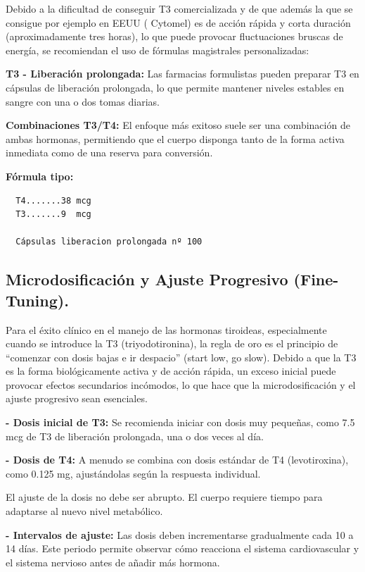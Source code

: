 \documentclass[
  spanish,
]{article}
\begin{document}
Debido a la dificultad de conseguir T3 comercializada y de que además la que se consigue por ejemplo en EEUU ( Cytomel) es de acción rápida y corta duración (aproximadamente tres horas), lo que puede provocar fluctuaciones bruscas de energía, se recomiendan el uso de fórmulas magistrales personalizadas:

\textbf{T3 - Liberación prolongada:} Las farmacias formulistas pueden preparar T3 en cápsulas de liberación prolongada, lo que permite mantener niveles estables en sangre con una o dos tomas diarias.

\textbf{Combinaciones T3/T4:} El enfoque más exitoso suele ser una combinación de ambas hormonas, permitiendo que el cuerpo disponga tanto de la forma activa inmediata como de una reserva para conversión.

\textbf{Fórmula tipo:}

\begin{verbatim}
  T4.......38 mcg
  T3.......9  mcg

  Cápsulas liberacion prolongada nº 100
\end{verbatim}

\subsection{Microdosificación y Ajuste Progresivo (Fine-Tuning).}\label{microdosificaciuxf3n-y-ajuste-progresivo-fine-tuning.}

Para el éxito clínico en el manejo de las hormonas tiroideas, especialmente cuando se introduce la T3 (triyodotironina), la regla de oro es el principio de ``comenzar con dosis bajas e ir despacio'' (start low, go slow).
Debido a que la T3 es la forma biológicamente activa y de acción rápida, un exceso inicial puede provocar efectos secundarios incómodos, lo que hace que la microdosificación y el ajuste progresivo sean esenciales.

\textbf{- Dosis inicial de T3:} Se recomienda iniciar con dosis muy pequeñas, como 7.5 mcg de T3 de liberación prolongada, una o dos veces al día.

\textbf{- Dosis de T4:} A menudo se combina con dosis estándar de T4 (levotiroxina), como 0.125 mg, ajustándolas según la respuesta individual.

El ajuste de la dosis no debe ser abrupto. El cuerpo requiere tiempo para adaptarse al nuevo nivel metabólico.

\textbf{- Intervalos de ajuste:} Las dosis deben incrementarse gradualmente cada 10 a 14 días.
Este periodo permite observar cómo reacciona el sistema cardiovascular y el sistema nervioso antes de añadir más hormona.
\end{document}
